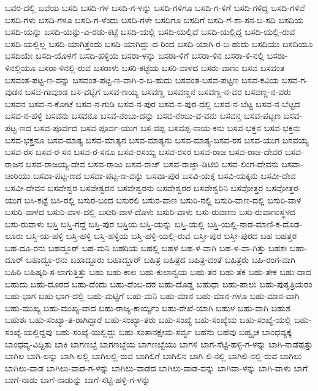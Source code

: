 ಬವರ-ದಲ್ಲಿ
ಬವೆಯ
ಬಸದಿ
ಬಸದಿ-ಗಳ
ಬಸದಿ-ಗ-ಳನ್ನು
ಬಸದಿ-ಗಳಿಗೂ
ಬಸದಿ-ಗ-ಳಿಗೆ
ಬಸದಿ-ಗಳಿದ್ದ
ಬಸದಿ-ಗಳಿವೆ
ಬಸದಿ-ಗಳು
ಬಸದಿ-ಗಳೂ
ಬಸದಿ-ಗ-ಳೆಂದು
ಬಸದಿ-ಗಳೇ
ಬಸದಿಗೂ
ಬಸದಿಗೆ
ಬಸದಿ-ಗೆ-ಶಾ-ಸನ-ಬ-ಸದಿ
ಬಸದಿಯ
ಬಸದಿ-ಯನ್ನು
ಬಸದಿ-ಯನ್ನು-ಎ-ರಡು-ಕಟ್ಟೆ
ಬಸದಿ-ಯಲ್ಲಿ
ಬಸದಿ-ಯಲ್ಲಿದೆ
ಬಸದಿ-ಯಲ್ಲಿದ್ದ
ಬಸದಿ-ಯಲ್ಲಿ-ರುವ
ಬಸದಿ-ಯಲ್ಲಿಲ್ಲ
ಬಸದಿ-ಯಾಗಿತ್ತೆಂದು
ಬಸದಿ-ಯಾಗಿದ್ದು-ದ-ರಿಂದ
ಬಸದಿ-ಯಾಗಿ-ರ-ಬ-ಹುದು
ಬಸದಿಯು
ಬಸದಿಯೂ
ಬಸದಿಯೇ
ಬಸದಿ-ಯೊಳಗೆ
ಬಸದಿ-ಹಳ್ಳಿಯ
ಬಸರಾ-ಳನ್ನು
ಬಸರಾ-ಳಿಗೆ
ಬಸರಾ-ಳಿನ
ಬಸರಾ-ಳಿ-ನಲ್ಲಿ
ಬಸರಾ-ಳಿನಲ್ಲಿಯೂ
ಬಸರಾ-ಳಿನಲ್ಲಿ-ರುವ
ಬಸರಾಳು
ಬಸರಿ-ಕಟ್ಟೆಯ
ಬಸರಿ-ವಾಳದ
ಬಸರು-ವಾಣು
ಬಸವ
ಬಸವಂತ
ಬಸವಂತ-ಪಟ್ಟ-ಣ-ವನ್ನು
ಬಸವಂತ-ಪಟ್ಟ-ಣ-ವಾಗಿ-ರ-ಬ-ಹುದು
ಬಸವಂತ-ಬಸವ-ಪಟ್ಟಣ
ಬಸವ-ಕವಿಯ
ಬಸವ-ಗ-ವುಡನ
ಬಸವ-ಗಾವುಂಡ
ಬಸ-ವಟ್ಟಿಗೆ
ಬಸವ-ಣಯ್ಯ
ಬಸವಣ್ಣ
ಬಸವಣ್ಣನ
ಬಸವಣ್ಣ-ನ-ವರ
ಬಸವಣ್ಣ-ನ-ವರು
ಬಸವನ
ಬಸವ-ನ-ಕೋಟೆ
ಬಸವ-ನ-ಗುಡಿ
ಬಸವ-ನ-ಪುರ
ಬಸವ-ನ-ಪುರ-ದಲ್ಲಿ
ಬಸವ-ನ-ಬೆಟ್ಟ
ಬಸವ-ನ-ಬೆಟ್ಟದ
ಬಸವ-ನ-ಹಳ್ಳಿ
ಬಸವನು
ಬಸವನೂ
ಬಸವ-ನೆಂಬು-ದನ್ನು
ಬಸವ-ನೆಂಬು-ವ-ವನು
ಬಸವನ್ತ
ಬಸವ-ಪಟ್ಟಣ
ಬಸವ-ಪಟ್ಟ-ಣದ
ಬಸವ-ಪೂರ್ವದ
ಬಸವ-ಪೂರ್ವ-ಯುಗ
ಬಸ-ವಪ್ಪ
ಬಸವಪ್ಪ-ನಾಯ-ಕನು
ಬಸವ-ಭಕ್ತನ
ಬಸವ-ಭಕ್ತನು
ಬಸವ-ಭಕ್ತನೂ
ಬಸವ-ಮಾತ್ಯ
ಬಸವ-ಮಾತ್ಯನ
ಬಸವ-ಮಾತ್ಯನು
ಬಸವ-ಮಾತ್ಯ-ಬಸವ-ರಸ
ಬಸವ-ಯುಗ
ಬಸವಯ್ಯ
ಬಸವ-ರಸ
ಬಸವ-ರ-ಸನ
ಬಸವ-ರ-ಸನೂ
ಬಸವ-ರಸಯ್ಯ
ಬಸವ-ರಸರ
ಬಸವ-ರಾಜ
ಬಸವ-ರಾಜ-ದೇವರ
ಬಸವ-ರಾಜನ
ಬಸವ-ರಾಜಯ್ಯ-ದೇವ
ಬಸವ-ರಾಜು
ಬಸವ-ರಾಜ್
ಬಸವ-ರಾಜ್ಡಾ-ಡಿಟಿಬಿ
ಬಸವ-ಲಿಂಗ-ದೇವನು
ಬಸವಾ-ಚಾರಿಯು
ಬಸವಾ-ಪಟ್ಟ-ಣದ
ಬಸವಾ-ಪಟ್ಟ-ಣ-ವನ್ನು
ಬಸವಾ-ಪುರ
ಬಸವಿ-ಯಕ್ಕ
ಬಸವಿ-ಯಕ್ಕನು
ಬಸವೀ-ದೇವ
ಬಸವೀ-ದೇವನ
ಬಸವೇಶ್ವರ
ಬಸವೇಶ್ವರನ
ಬಸವೇಶ್ವರನು
ಬಸವೇಶ್ವರರ
ಬಸವೇಶ್ವರಿನಿ
ಬಸವೋತ್ತರ
ಬಸವೋತ್ತರ-ಯುಗ
ಬಸಿ-ಕಟ್ಟೆ
ಬಸಿ-ರಲ್ಲಿ
ಬಸುರ-ಬಂದ
ಬಸುರಲಿ
ಬಸುರ-ವಾಣ
ಬಸುರಿ-ನಲ್ಲಿ
ಬಸುರಿ-ವಾಣ-ದಲ್ಲಿ
ಬಸುರಿ-ವಾಳ
ಬಸುರಿ-ವಾಳದ
ಬಸುರಿ-ವಾಳ-ದಲ್ಲಿ
ಬಸುರಿ-ವಾಳ-ದೊಳು
ಬಸುರಿ-ವಾಳು
ಬಸು-ರುವಾಣು
ಬಸು-ರುವಾಣುಸ್ಥಳದ
ಬಸು-ರುವಾಳು
ಬಸ್ತಿ
ಬಸ್ತಿ-ಗದ್ದೆ
ಬಸ್ತಿ-ಪುರ
ಬಸ್ತಿಯ
ಬಸ್ತಿ-ಯನ್ನು
ಬಸ್ತಿ-ಯಲ್ಲಿ
ಬಸ್ತಿ-ಯಲ್ಲಿ-ನಾಡ-ಮಾಣಿ-ಕ-ದೊಡ-ಲೂರು
ಬಸ್ತಿ-ಯ-ಹಳ್ಳಿ
ಬಸ್ತಿ-ಹಳ್ಳಿ
ಬಸ್ತಿ-ಹಳ್ಳಿಯ
ಬಸ್ತಿ-ಹಳ್ಳಿ-ಯಲ್ಲಿ-ರುವ
ಬಸ್ತೀ-ಪುರ
ಬಸ್ತೀ-ಪುರದ
ಬಹ
ಬಹತ್ತರ
ಬಹ-ದೂ-ರನು
ಬಹದ್ದೂರ್
ಬಹ-ಮನಿ
ಬಹರಿಯ
ಬಹಲ್ಲಿ
ಬಹಳ
ಬಹ-ಳ-ವಾಗಿ
ಬಹ-ಳ-ವಾ-ಗಿತ್ತು
ಬಹಶಃ
ಬಹಾ-ದೂರ್
ಬಹಾದ್ದೂ-ರನು
ಬಹಾದ್ದೂರು
ಬಹಾದ್ದೂರ್
ಬಹಿತ್ರ
ಬಹಿತ್ರದ
ಬಹಿತ್ರ-ದಂತೆ
ಬಹಿತ್ರರು
ಬಹಿ-ರಂಗ-ವಾಗಿ
ಬಹಿರಿ
ಬಹಿಷ್ಕರಿ-ಸ-ಲಾಗುತ್ತಿತ್ತು
ಬಹು
ಬಹು-ಕಾಲ
ಬಹು-ಕುಲಾನ್ವಯ
ಬಹು-ತರ
ಬಹು-ತೆಕ
ಬಹು-ತೇಕ
ಬಹು-ದಾದ
ಬಹುದು
ಬಹು-ದೂರದ
ಬಹು-ದೆಂದು
ಬಹು-ದೆಂಬ-ದರ
ಬಹು-ದೊಡ್ಡ
ಬಹುಧಾ
ಬಹು-ಪಾಲು
ಬಹು-ಪುತೃತ್ರಿಯರಂ
ಬಹು-ಭಾಗ
ಬಹು-ಭಾಗ-ದಲ್ಲಿ
ಬಹು-ಮಟ್ಟಿಗೆ
ಬಹು-ಮನಿ
ಬಹು-ಮಾನ
ಬಹು-ಮಾನ-ಗಳೂ
ಬಹು-ಮಾನ-ವಾಗಿ
ಬಹು-ಮುಖ್ಯ
ಬಹು-ಮುಖ್ಯ-ವಾದ
ಬಹು-ರಾಜ್ಯ-ಕಾರ್ಯ್ಯಂ
ಬಹು-ರೇಖೆ-ಯಾಗಿ
ಬಹುಳ
ಬಹು-ವಾಗಿ
ಬಹುಶ
ಬಹುಶಃ
ಬಹು-ಸಂಖ್ಯಾ-ತ-ರಾಗಿದ್ದಾರೆ
ಬಹು-ಸಂಖ್ಯಾ-ತರು
ಬಹು-ಸಂಖ್ಯೆ
ಬಹು-ಸಂಖ್ಯೆಯ
ಬಹು-ಸಂಖ್ಯೆ-ಯಲ್ಲಿ
ಬಹು-ಸಂಖ್ಯೆ-ಯಲ್ಲಿದ್ದವು
ಬಹು-ಸಂಖ್ಯೆ-ಯಲ್ಲಿದ್ದು
ಬಹು-ಸಂತಾನಕ್ಷೇಮ-ಸರ್ವ್ವ
ಬಹೆನು
ಬಹೆವು
ಬಹ್ವೃಚ
ಬಾಂಧವ್ಯಕ್ಕೆ
ಬಾಂಧವ್ಯ-ವಿದ್ದಿತು
ಬಾಕಿ
ಬಾಗಣಬ್ಬೆ
ಬಾಗಣಬ್ಬೆಯ
ಬಾಗಣಬ್ಬೆಯು
ಬಾಗಳಿ
ಬಾಗ-ಸೆಟ್ಟಿ-ಹಳ್ಳಿ-ಗ-ಳನ್ನು
ಬಾಗಿ-ನಾಡೆಪ್ಪತ್ತು
ಬಾಗಿಲ
ಬಾಗಿ-ಲನ್ನು
ಬಾಗಿ-ಲಲ್ಲಿ
ಬಾಗಿಲಲ್ಲಿ-ರುವ
ಬಾಗಿಲಿಗೆ
ಬಾಗಿಲಿನ
ಬಾಗಿ-ಲಿ-ನಲ್ಲಿ
ಬಾಗಿಲಿ-ನಲ್ಲಿ-ರುವ
ಬಾಗಿಲು
ಬಾಗಿಲು-ವಾಡ
ಬಾಗಿಲು-ವಾಡ-ಗ-ಳನ್ನು
ಬಾಗಿಲು-ವಾಡದ
ಬಾಗಿಲು-ವಾಡ-ವನ್ನು
ಬಾಗಿವಾ-ಳನ್ನು
ಬಾಗಿ-ವಾಳು
ಬಾಗೆ
ಬಾಗೆ-ನಾಡು
ಬಾಗೆ-ನಾಡುನ್ನು
ಬಾಗೆ-ಸೆಟ್ಟಿ-ಹಳ್ಳಿ-ಗ-ಳನ್ನು
